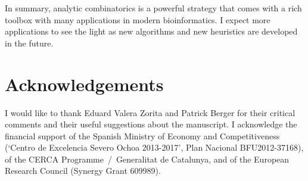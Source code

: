 \documentclass{article}
\begin{document}
In summary, analytic combinatorics is a powerful strategy that comes with
a rich toolbox with many applications in modern bioinformatics. I expect
more applications to see the light as new algorithms and new heuristics
are developed in the future.


\section*{Acknowledgements}

I would like to thank Eduard Valera Zorita and Patrick Berger for their
critical comments and their useful suggestions about the manuscript. I
acknowledge the financial support of the Spanish Ministry of Economy and
Competitiveness (‘Centro de Excelencia Severo Ochoa 2013-2017’, Plan
Nacional BFU2012-37168), of the CERCA Programme~/~Generalitat de
Catalunya, and of the European Research Council (Synergy Grant 609989).






\end{document}
